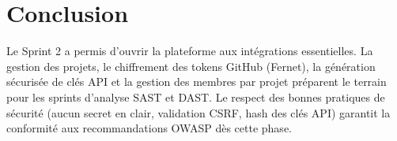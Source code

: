 \section{Conclusion}
Le Sprint 2 a permis d'ouvrir la plateforme aux intégrations essentielles. La gestion des projets, le chiffrement des tokens GitHub (Fernet), la génération sécurisée de clés API et la gestion des membres par projet préparent le terrain pour les sprints d'analyse SAST et DAST. Le respect des bonnes pratiques de sécurité (aucun secret en clair, validation CSRF, hash des clés API) garantit la conformité aux recommandations OWASP dès cette phase.
